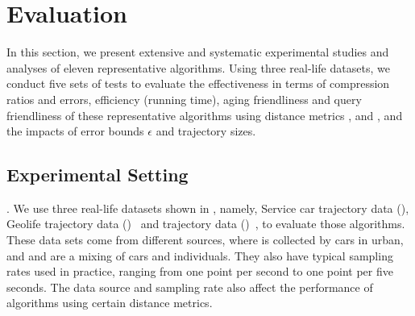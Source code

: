 \section{Evaluation} %
\label{sec-exp}
In this section, we present extensive and systematic experimental studies and analyses of eleven representative \lsa algorithms.
Using three real-life datasets, we conduct five sets of tests to evaluate  the effectiveness in terms of compression ratios and errors, efficiency (running time), aging friendliness and query friendliness of these representative algorithms using distance metrics \ped, \sed and \dad, and the impacts of error bounds $\epsilon$ and trajectory sizes.
%

\subsection{Experimental Setting}

.
We use three real-life datasets shown in , namely, Service car trajectory data (\ucar), Geolife trajectory data (\geolife)~\cite{Web:Geolife} and \mopsi trajectory data (\mopsi)~\cite{Web:Mopsi}, to evaluate those \lsa algorithms.
These data sets come from different sources, where \ucar is collected by cars in urban, and \geolife and \mopsi are a mixing of cars and individuals. They also have {typical sampling rates used in practice, ranging from one point per second to one point per five seconds.}
The data source and sampling rate also affect the performance of \lsa algorithms using certain distance metrics.



